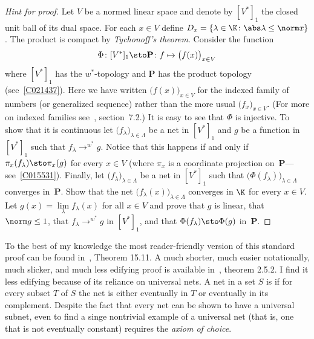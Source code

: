 \begin{proof}[\emph{Hint for proof}] Let $V$ be a normed linear space and denote by $[V^*]_1$ the closed unit ball of its
dual space.  For each $x \in V$ define $D_x = \{\lambda \in \K \colon \abs\lambda \le \norm x\}$.  The product
 is compact by \emph{Tychonoff's theorem}.  Consider the function
   \[ \Phi\colon [V^*]_1 \sto \mathbf P \colon f \mapsto \bigl(f(x)\bigr)_{x \in V} \]
where $[V^*]_1$ has the $w^*$-topology and $\mathbf P$ has the product topology (see~\ref{C021437}).  Here we have written
$\bigl(f(x)\bigr)_{x \in V}$ for the indexed family of numbers (or generalized sequence) rather than the more usual
$\bigl(f_x\bigr)_{x \in V}$.  (For more on indexed families see~\cite{Erdman:2007}, section~7.2.)  It is easy to see that
$\Phi$ is injective.  To show that it is continuous let $\bigl(f_\lambda\bigr)_{\lambda \in \Lambda}$ be a net in $[V^*]_1$
and $g$ be a function in $[V^*]_1$ such that $f_\lambda \to^{w^*} g$.  Notice that this happens if and only if
$\pi_x(f_\lambda) \sto \pi_x(g)$ for every $x \in V$ (where $\pi_x$ is a coordinate projection on~$\mathbf P$---see~\ref{C015531}).
Finally, let $\bigl(f_\lambda\bigr)_{\lambda \in \Lambda}$ be a net in $[V^*]_1$ such that $\bigl(\Phi(f_\lambda)\bigr)_{\lambda \in \Lambda}$
converges in~$\mathbf P$.  Show that the net $\bigl(f_\lambda(x)\bigr)_{\lambda \in \Lambda}$ converges in $\K$ for every $x \in V$.
Let $g(x) = \lim\limits_\lambda f_\lambda(x)$ for all $x \in V$ and prove that $g$ is linear, that $\norm g \le 1$, that
$f_\lambda \to^{w^*} g$ in $[V^*]_1$, and that $\Phi(f_\lambda) \sto \Phi(g)$ in~$\mathbf P$.  \ns
\end{proof}

To the best of my knowledge the most reader-friendly version of this standard proof can be found in~\cite{BrownP:1977}, Theorem 15.11.
A much shorter, much easier notationally, much slicker, and much less edifying proof is available in~\cite{Pedersen:1995}, theorem 2.5.2.
I find it less edifying because of its reliance on universal nets.  A net in a set $S$ is
 if for every subset $T$ of $S$ the net is either eventually in $T$ or eventually in its complement. Despite the fact that
every net can be shown to have a universal subnet, even to find a singe nontrivial example of a universal net (that is, one that is not
eventually constant) requires the \emph{axiom of choice}.



















